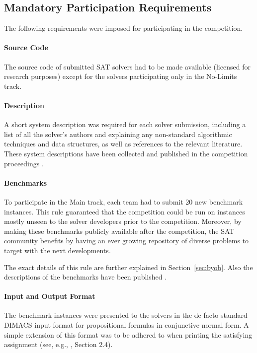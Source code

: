 \documentclass{elsarticle}
\begin{document}
\subsection{Mandatory Participation Requirements}
\label{sec:rules}

The following requirements were imposed for 
participating in the competition.

\paragraph{Source Code}
The source code of submitted SAT solvers had to be made available 
(licensed for research purposes) except for the solvers participating only in the No-Limits track.

\paragraph{Description}
A short system description was required for each solver submission,
including a list of all the solver's authors and explaining any non-standard algorithmic
techniques and data structures, as well as references to the relevant literature.
These system descriptions have been collected and published in the competition
proceedings \cite{SC2020}.

\paragraph{Benchmarks}
To participate in the Main track, each team had to submit 20 new benchmark instances.
This rule guaranteed that the competition could be run on instances mostly unseen to the solver
developers prior to the competition. Moreover, by making these benchmarks publicly available
after the competition, the SAT community benefits by having an ever growing repository 
of diverse problems to target with the next developments.

The exact details of this rule are further explained in Section~\ref{sec:byob}.
Also the descriptions of the benchmarks have been published \cite{SC2020}.

\paragraph{Input and Output Format}

The benchmark instances were presented to the solvers in the de facto standard
DIMACS input format for propositional formulas in conjunctive normal form.
A simple extension of this format was to be adhered to when printing 
the satisfying assignment 
(see, e.g., \cite{DBLP:journals/jsat/HeuleJS19}, Section 2.4).
\end{document}
